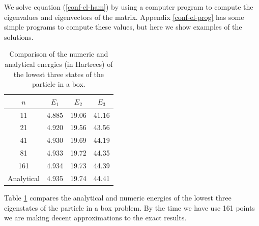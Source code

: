 We solve equation (\ref{conf-el-ham}) by using a computer program to
compute the eigenvalues and eigenvectors of the matrix. Appendix
\ref{conf-el-prog} has some simple programs to compute these values,
but here we show examples of the solutions.

\begin{table}
\caption{Comparison of the numeric and analytical energies (in
Hartrees) of the lowest three states of the particle in a box.}
\label{conf-el-compare}
\begin{center}
\begin{tabular}{cccc}\\ \hline\hline
$n$ & $E_1$ & $E_2$ & $E_3$ \\ \hline
11 & 4.885 & 19.06 & 41.16 \\
21 & 4.920 & 19.56 & 43.56 \\
41 & 4.930 & 19.69 & 44.19 \\
81 & 4.933 & 19.72 & 44.35 \\
161 & 4.934 & 19.73 & 44.39 \\
Analytical & 4.935 & 19.74 & 44.41 \\ \hline\hline
\end{tabular}
\end{center}
\end{table}

Table \ref{conf-el-compare} compares the analytical and numeric
energies of the lowest three eigenstates of the particle in a box
problem. By the time we have use 161 points we are making decent
approximations to the exact results.

